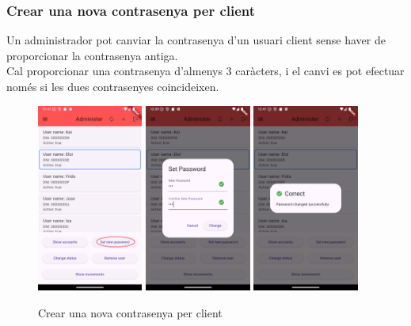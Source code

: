 \documentclass[a4paper,12pt,twoside]{ThesisStyle}
\begin{document}
\clearpage
\subsubsection{Crear una nova contrasenya per client}
\label{subsubsec: Crear una nova contrasenya per client}

Un administrador pot canviar la contrasenya d'un usuari client sense haver de proporcionar la contrasenya antiga.\\

Cal proporcionar una contrasenya d'almenys 3 caràcters, i el canvi es pot efectuar només si les dues contrasenyes coincideixen.

\begin{figure}[h]
    \centering
    \includegraphics[width=0.31\textwidth]{imatges/mainAdmin2.png}
    \includegraphics[width=0.31\textwidth]{imatges/setPassword2.png}
    \includegraphics[width=0.31\textwidth]{imatges/setPassword3.png}
    \caption{Crear una nova contrasenya per client}
    \label{fig: Crear una nova contrasenya per client}
\end{figure}
\end{document}
